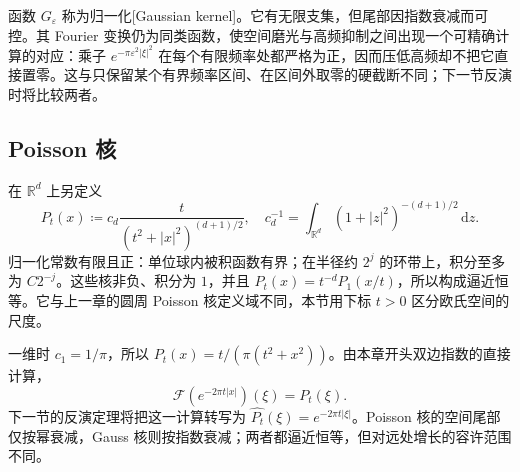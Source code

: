 函数 \(G_\varepsilon\) 称为归一化[Gaussian kernel]。它有无限支集，但尾部因指数衰减而可控。其 Fourier 变换仍为同类函数，使空间磨光与高频抑制之间出现一个可精确计算的对应：乘子 \(e^{-\pi\varepsilon^2|\xi|^2}\) 在每个有限频率处都严格为正，因而压低高频却不把它直接置零。这与只保留某个有界频率区间、在区间外取零的硬截断不同；下一节反演时将比较两者。

\subsection{Poisson 核}
\label{b2:subsec:030404}

在 \(\mathbb R^d\) 上另定义
\[
 P_t(x)\coloneqq c_d\dfrac{t}{(t^2+|x|^2)^{(d+1)/2}},
 \quad
 c_d^{-1}=\int_{\mathbb R^d}(1+|z|^2)^{-(d+1)/2}\,\mathrm{d}z.
\]
归一化常数有限且正：单位球内被积函数有界；在半径约 \(2^j\) 的环带上，积分至多为 \(C2^{-j}\)。这些核非负、积分为 \(1\)，并且 \(P_t(x)=t^{-d}P_1(x/t)\)，所以构成逼近恒等。它与上一章的圆周 Poisson 核定义域不同，本节用下标 \(t>0\) 区分欧氏空间的尺度。

\ProseParagraphBreak

一维时 \(c_1=1/\pi\)，所以 \(P_t(x)=t/(\pi(t^2+x^2))\)。由本章开头双边指数的直接计算，
\[
 \mathcal F(e^{-2\pi t|x|})(\xi)=P_t(\xi).
\]
下一节的反演定理将把这一计算转写为 \(\widehat {P_t}(\xi)=e^{-2\pi t|\xi|}\)。Poisson 核的空间尾部仅按幂衰减，Gauss 核则按指数衰减；两者都逼近恒等，但对远处增长的容许范围不同。
